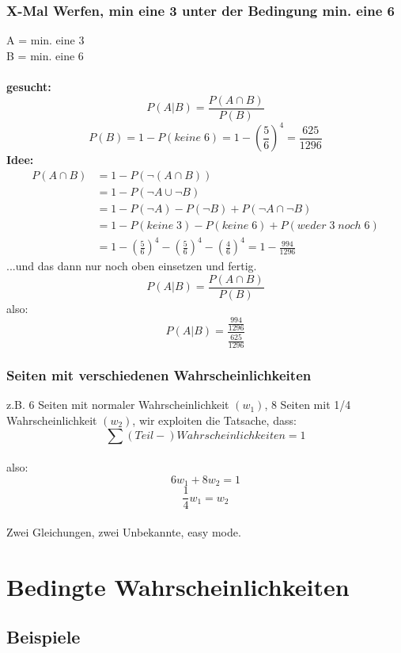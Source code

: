 \documentclass{article}
\begin{document}
\subsubsection{X-Mal Werfen, min eine 3 unter der Bedingung min. eine 6}
A = min. eine 3 \\
B = min. eine 6 \\\\
\textbf{gesucht:} \[P(A|B) = \frac{P(A\cap B)}{P(B)} \]
\[P(B) = 1-P(keine\;6) = 1-\left(\frac{5}{6}\right)^4 = \frac{625}{1296}\]
\textbf{Idee:}
\begin{align*}
	P(A\cap B) 	&= 1-P(\neg (A\cap B))\\
							   &= 1-P(\neg A \cup \neg B)\\
							&= 1-P(\neg A) - P(\neg B) + P(\neg A \cap \neg B)\\
						 &= 1-P(keine\;3)-P(keine\;6)+P(weder\;3\;noch\;6)\\
						 &= 1-\left( \frac{5}{6}\right)^4-\left( \frac{5}{6}\right)^4-\left( \frac{4}{6}\right)^4 = 1- \frac{994}{1296}
\end{align*}
...und das dann nur noch oben einsetzen und fertig.
\[P(A|B) = \frac{P(A\cap B)}{P(B)} \]
also:
\[P(A|B) = \frac{\frac{994}{1296}}{\frac{625}{1296}}\]

\subsubsection{Seiten mit verschiedenen Wahrscheinlichkeiten}
z.B. 6 Seiten mit normaler Wahrscheinlichkeit $(w_1)$, 8 Seiten mit 1/4 Wahrscheinlichkeit
$(w_2)$, wir exploiten die Tatsache, dass: \\ \[ \sum
(Teil-)Wahrscheinlichkeiten = 1 \]\\
also:\\
\begin{equation}	
6w_1 + 8w_2 = 1 \end{equation}
\begin{equation}	
	\frac{1}{4}w_1 = w_2 
\end{equation}\\
Zwei Gleichungen, zwei Unbekannte, easy mode.

\section{Bedingte Wahrscheinlichkeiten}
\subsection{Beispiele}
\end{document}
